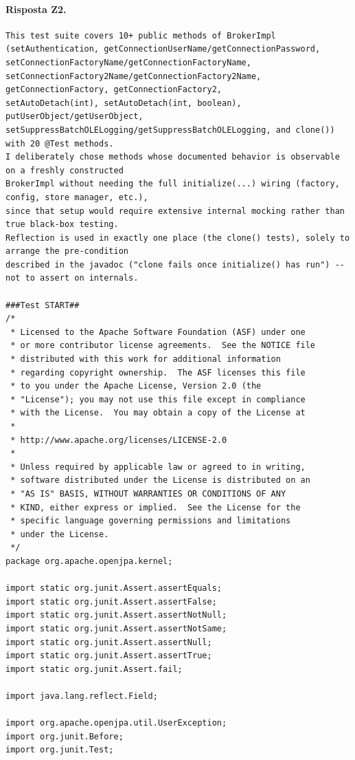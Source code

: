 \paragraph*{Risposta Z2.}
\label{risposta:z2}
\begin{lstlisting}
This test suite covers 10+ public methods of BrokerImpl
(setAuthentication, getConnectionUserName/getConnectionPassword, setConnectionFactoryName/getConnectionFactoryName,
setConnectionFactory2Name/getConnectionFactory2Name, getConnectionFactory, getConnectionFactory2,
setAutoDetach(int), setAutoDetach(int, boolean), putUserObject/getUserObject,
setSuppressBatchOLELogging/getSuppressBatchOLELogging, and clone()) with 20 @Test methods.
I deliberately chose methods whose documented behavior is observable on a freshly constructed
BrokerImpl without needing the full initialize(...) wiring (factory, config, store manager, etc.),
since that setup would require extensive internal mocking rather than true black-box testing.
Reflection is used in exactly one place (the clone() tests), solely to arrange the pre-condition
described in the javadoc ("clone fails once initialize() has run") -- not to assert on internals.

###Test START##
/*
 * Licensed to the Apache Software Foundation (ASF) under one
 * or more contributor license agreements.  See the NOTICE file
 * distributed with this work for additional information
 * regarding copyright ownership.  The ASF licenses this file
 * to you under the Apache License, Version 2.0 (the
 * "License"); you may not use this file except in compliance
 * with the License.  You may obtain a copy of the License at
 *
 * http://www.apache.org/licenses/LICENSE-2.0
 *
 * Unless required by applicable law or agreed to in writing,
 * software distributed under the License is distributed on an
 * "AS IS" BASIS, WITHOUT WARRANTIES OR CONDITIONS OF ANY
 * KIND, either express or implied.  See the License for the
 * specific language governing permissions and limitations
 * under the License.
 */
package org.apache.openjpa.kernel;

import static org.junit.Assert.assertEquals;
import static org.junit.Assert.assertFalse;
import static org.junit.Assert.assertNotNull;
import static org.junit.Assert.assertNotSame;
import static org.junit.Assert.assertNull;
import static org.junit.Assert.assertTrue;
import static org.junit.Assert.fail;

import java.lang.reflect.Field;

import org.apache.openjpa.util.UserException;
import org.junit.Before;
import org.junit.Test;


\end{lstlisting}
